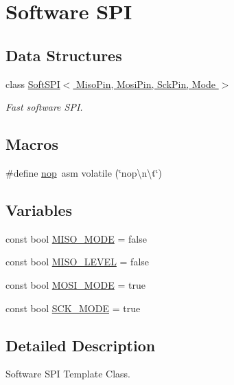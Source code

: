 \hypertarget{group__soft_s_p_i}{\section{Software S\-P\-I}
\label{group__soft_s_p_i}
}
\subsection*{Data Structures}
\begin{DoxyCompactItemize}
\item 
class \hyperlink{class_soft_s_p_i}{Soft\-S\-P\-I$<$ Miso\-Pin, Mosi\-Pin, Sck\-Pin, Mode $>$}
\begin{DoxyCompactList}\small\item\em Fast software S\-P\-I. \end{DoxyCompactList}\end{DoxyCompactItemize}
\subsection*{Macros}
\begin{DoxyCompactItemize}
\item 
\#define \hyperlink{group__soft_s_p_i_ga51158539d4d6022c9a445e78b0abfa94}{nop}~asm volatile (\char`\"{}nop\textbackslash{}n\textbackslash{}t\char`\"{})
\end{DoxyCompactItemize}
\subsection*{Variables}
\begin{DoxyCompactItemize}
\item 
const bool \hyperlink{group__soft_s_p_i_gad7667379ccd35490d35bb159b1492ea2}{M\-I\-S\-O\-\_\-\-M\-O\-D\-E} = false
\item 
const bool \hyperlink{group__soft_s_p_i_ga5ed39ec843c7f42ec220a59c0b486718}{M\-I\-S\-O\-\_\-\-L\-E\-V\-E\-L} = false
\item 
const bool \hyperlink{group__soft_s_p_i_gadfe834b166b0ff6be3271f17420e72ec}{M\-O\-S\-I\-\_\-\-M\-O\-D\-E} = true
\item 
const bool \hyperlink{group__soft_s_p_i_gac89532527cf817a2f48730a107fe82ae}{S\-C\-K\-\_\-\-M\-O\-D\-E} = true
\end{DoxyCompactItemize}


\subsection{Detailed Description}
Software S\-P\-I Template Class. 

